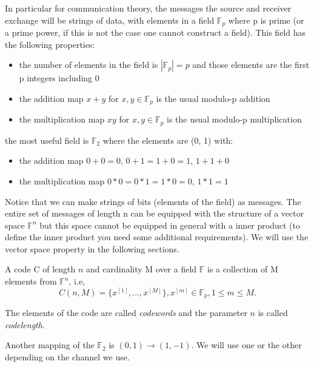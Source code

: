 In particular for communication theory, the messages the source and receiver exchange will be strings of data, with elements in a field $\mathbb{F}_p$ where p is prime (or a prime power, if this is not the case one cannot construct a field). This field has the following properties:

\begin{itemize}
	\item the number of elements in the field is $|\mathbb{F}_p| = p$ and those elements are the first p integers including 0
	\item the addition map $x + y$  for $x, y \in \mathbb{F}_p$ is the usual modulo-p addition
	\item the multiplication map $xy$  for $x, y \in \mathbb{F}_p$ is the usual modulo-p multiplication
\end{itemize}

the most useful field is $\mathbb{F}_2$ where the elements are (0, 1) with:

\begin{itemize}
	\item the addition map $0 + 0 = 0$, $0 + 1 = 1 + 0 = 1$, $1 + 1 + 0$
	\item the multiplication map $0*0 = 0*1 = 1*0 = 0$, $1*1 = 1$
\end{itemize}


Notice that we can make strings of bits (elements of the field) as messages. The entire set of messages of length n can be equipped with the structure of a vector space $\mathbb{F}^n$ but this space cannot be equipped in general with a inner product (to define the inner product you need some additional requirements). We will use the vector space property in the following sections. 

\begin{definition}[Codes]
	A code C of length $n$ and cardinality M over a field $\mathbb{F}$ is a collection of M elements from $\mathbb{F}^n$, i.e,
	\begin{equation}
	C(n, M) = \{x^{[1]}, \dots, x^{[M]} \}, x^{[m]} \in \mathbb{F}_p, 1\le m\le M.
	\end{equation}
\end{definition}
The elements of the code are called \emph{codewords} and the parameter $n$ is called \emph{codelength}. 

Another mapping of the $\mathbb{F}_2$ is $(0,1) \rightarrow (1, -1)$. We will use one or the other depending on the channel we use. 

